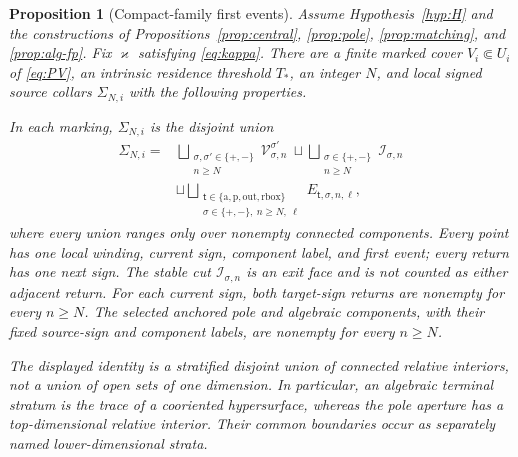\documentclass[11pt,reqno]{amsart}
\numberwithin{equation}{section}
\newtheorem{proposition}[theorem]{Proposition}
\theoremstyle{definition}
\theoremstyle{remark}
\begin{document}
\begin{proposition}[Compact-family first events]\label{prop:first-events}
Assume Hypothesis~\ref{hyp:H} and the constructions of
Propositions~\ref{prop:central}, \ref{prop:pole},
\ref{prop:matching}, and \ref{prop:alg-fp}.  Fix $\varkappa$ satisfying
\eqref{eq:kappa}.  There are a finite marked cover $V_i\Subset U_i$ of
\eqref{eq:PV}, an intrinsic residence threshold $T_*$, an integer $N$, and
local signed source collars $\Sigma_{N,i}$ with the following properties.

In each marking, $\Sigma_{N,i}$ is the disjoint union
\begin{equation}\label{eq:census}
 \begin{aligned}
  \Sigma_{N,i}={}&
   \bigsqcup_{\substack{\sigma,\sigma'\in\{+,-\}\\n\ge N}}
      \mathcal V_{\sigma,n}^{\sigma'}
   \ \sqcup\!
   \bigsqcup_{\substack{\sigma\in\{+,-\}\\n\ge N}}
      \mathcal I_{\sigma,n}\\
   &\sqcup
   \bigsqcup_{\substack{\mathsf t\in
        \{\mathrm a,\mathrm p,\mathrm{out},\mathrm{rbox}\}\\
        \sigma\in\{+,-\},\ n\ge N,\ \ell}}
      E_{\mathsf t,\sigma,n,\ell},
 \end{aligned}
\end{equation}
where every union ranges only over nonempty connected components.  Every
point has one local winding, current sign, component label, and first event;
every return has one next sign.  The stable cut $\mathcal I_{\sigma,n}$ is an
exit face and is not counted as either adjacent return.  For each current
sign, both target-sign returns are nonempty for every $n\ge N$.  The selected
anchored pole and algebraic components, with their fixed source-sign and
component labels, are nonempty for every $n\ge N$.

The displayed identity is a stratified disjoint union of connected relative
interiors, not a union of open sets of one dimension.  In particular, an
algebraic terminal stratum is the trace of a cooriented hypersurface, whereas
the pole aperture has a top-dimensional relative interior.  Their common
boundaries occur as separately named lower-dimensional strata.


\end{proposition}
\end{document}
